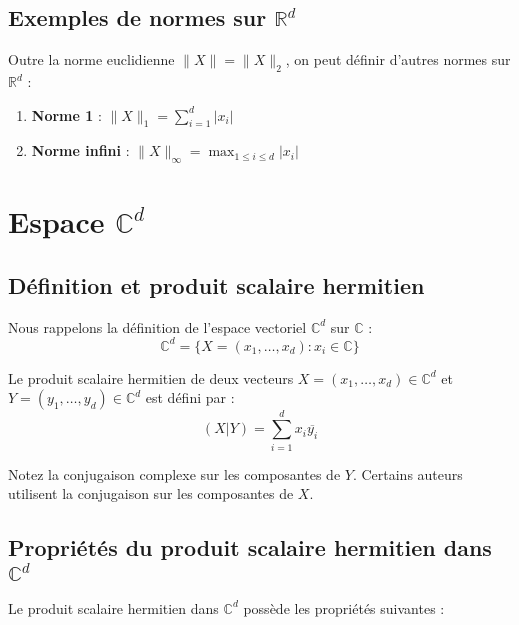 \documentclass[oneside]{book}
\begin{document}
\subsection{Exemples de normes sur $\mathbb{R}^d$}

Outre la norme euclidienne $\|X\| = \|X\|_2$, on peut définir d'autres normes sur $\mathbb{R}^d$ :

\begin{enumerate}
    \item \textbf{Norme 1} : $\|X\|_1 = \sum_{i=1}^d |x_i|$
    \item \textbf{Norme infini} : $\|X\|_\infty = \max_{1 \leq i \leq d} |x_i|$
\end{enumerate}


\section{Espace $\mathbb{C}^d$}

\subsection{Définition et produit scalaire hermitien}

Nous rappelons la définition de l'espace vectoriel $\mathbb{C}^d$ sur $\mathbb{C}$ :
\[
\mathbb{C}^d = \{X = (x_1, \ldots, x_d) : x_i \in \mathbb{C}\}
\]

\begin{definition}
Le produit scalaire hermitien de deux vecteurs $X = (x_1, \ldots, x_d) \in \mathbb{C}^d$ et $Y = (y_1, \ldots, y_d) \in \mathbb{C}^d$ est défini par :
\[
(X|Y) = \sum_{i=1}^d x_i \overline{y_i}
\]
\end{definition}
Notez la conjugaison complexe sur les composantes de $Y$. Certains auteurs utilisent la conjugaison sur les composantes de $X$.

\subsection{Propriétés du produit scalaire hermitien dans $\mathbb{C}^d$}

Le produit scalaire hermitien dans $\mathbb{C}^d$ possède les propriétés suivantes :
\end{document}
